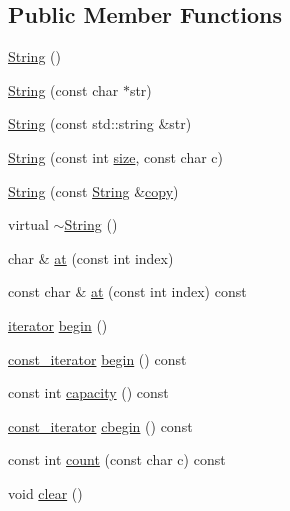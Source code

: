 \subsection*{Public Member Functions}
\begin{DoxyCompactItemize}
\item 
\hyperlink{classprism_1_1_string_a3a9df9dd5d297b91d2eec1ef7c4db8d3}{String} ()
\item 
\hyperlink{classprism_1_1_string_ad273f297c9125493c40876e368347fbf}{String} (const char $\ast$str)
\item 
\hyperlink{classprism_1_1_string_aedf9c8008bc992012ed8dea7b312683c}{String} (const std\+::string \&str)
\item 
\hyperlink{classprism_1_1_string_ac14b5c78edff344d549496eba0b226c5}{String} (const int \hyperlink{classprism_1_1_string_a603b5a90681d43adf7c6c29018e0300c}{size}, const char c)
\item 
\hyperlink{classprism_1_1_string_a6734cae1e3f2165a4a5d1f48cb56d0fe}{String} (const \hyperlink{classprism_1_1_string}{String} \&\hyperlink{namespaceprism_ae776f4cd825f79e7af1cf6ee1d90a209}{copy})
\item 
virtual \hyperlink{classprism_1_1_string_ab0114c8ba868b0facea3286d2764f010}{$\sim$\+String} ()
\item 
char \& \hyperlink{classprism_1_1_string_a2bbac16806974edd5c6d0d1d19ac7d5a}{at} (const int index)
\item 
const char \& \hyperlink{classprism_1_1_string_a55e86af07823ab80c1b6b0849231312b}{at} (const int index) const 
\item 
\hyperlink{classprism_1_1_string_adacc7975837e5fff95d70690777fb330}{iterator} \hyperlink{classprism_1_1_string_ae8f176fbe590422a3061552b8ed36ec5}{begin} ()
\item 
\hyperlink{classprism_1_1_string_a8b46f0fbe9c5c94ba892975242e3ab68}{const\+\_\+iterator} \hyperlink{classprism_1_1_string_ab3b18cfb5a3de6481f2f3d82bf5f0ef6}{begin} () const 
\item 
const int \hyperlink{classprism_1_1_string_a79a0e1b2a185376d36935ff637ba5678}{capacity} () const 
\item 
\hyperlink{classprism_1_1_string_a8b46f0fbe9c5c94ba892975242e3ab68}{const\+\_\+iterator} \hyperlink{classprism_1_1_string_a75949922d27570e2e10bb9b48c12040b}{cbegin} () const 
\item 
const int \hyperlink{classprism_1_1_string_adde5ee34a762ec89df4354f562cb4c39}{count} (const char c) const 
\item 
void \hyperlink{classprism_1_1_string_adcfa3f36badcb9e84c2c956a6b29c865}{clear} ()

\end{DoxyCompactItemize}

